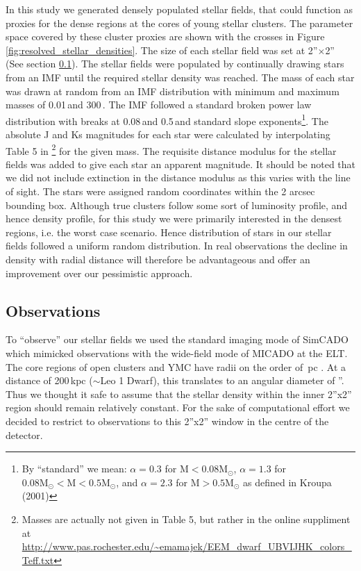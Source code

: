 In this study we generated densely populated stellar fields, that could function as proxies for the dense regions at the cores of young stellar clusters. The parameter space covered by these cluster proxies are shown with the crosses in Figure \ref{fig:resolved_stellar_densities}. The size of each stellar field was set at 2''$\times$2'' (See section \ref{sec:telescope}). The stellar fields were populated by continually drawing stars from an IMF until the required stellar density was reached. The mass of each star was drawn at random from an IMF distribution with minimum and maximum masses of 0.01\,\msun and 300\,\msun. The IMF followed a standard \citet{kroupa2001} broken power law distribution with breaks at 0.08\,\msun and 0.5\,\msun and standard slope exponents\footnote{By ``standard'' we mean: $\alpha=0.3$ for $\mathrm{M} < 0.08 \mathrm{M}_\odot$, $\alpha=1.3$ for $0.08\mathrm{M}_\odot < \mathrm{M} < 0.5 \mathrm{M}_\odot$, and $\alpha=2.3$ for $\mathrm{M} > 0.5 \mathrm{M}_\odot$ as defined in Kroupa (2001)}. The absolute J and Ks magnitudes for each star were calculated by interpolating Table 5 in \citet{pecaut2013}\footnote{Masses are actually not given in Table 5, but rather in the online suppliment at \url{http://www.pas.rochester.edu/~emamajek/EEM_dwarf_UBVIJHK_colors_Teff.txt}} for the given mass. The requisite distance modulus for the stellar fields was added to give each star an apparent magnitude. It should be noted that we did not include extinction in the distance modulus as this varies with the line of sight. The stars were assigned random coordinates within the 2 arcsec bounding box. Although true clusters follow some sort of luminosity profile, and hence density profile, for this study we were primarily interested in the densest regions, i.e. the worst case scenario. Hence distribution of stars in our stellar fields followed a uniform random distribution. In real observations the decline in density with radial distance will therefore be advantageous and offer an improvement over our pessimistic approach.


\subsection{Observations}
\label{sec:telescope}

To ``observe'' our stellar fields we used the standard imaging mode of SimCADO \citep{leschinski2016} which mimicked observations with the wide-field mode of MICADO at the ELT. The core regions of open clusters and YMC have radii on the order of \,pc \citep{portegies2010}. At a distance of 200\,kpc ($\sim$Leo 1 Dwarf), this translates to an angular diameter of ''. Thus we thought it safe to assume that the stellar density within the inner 2''x2'' region should remain relatively constant. For the sake of computational effort we decided to restrict to observations to this 2''x2'' window in the centre of the detector. 

